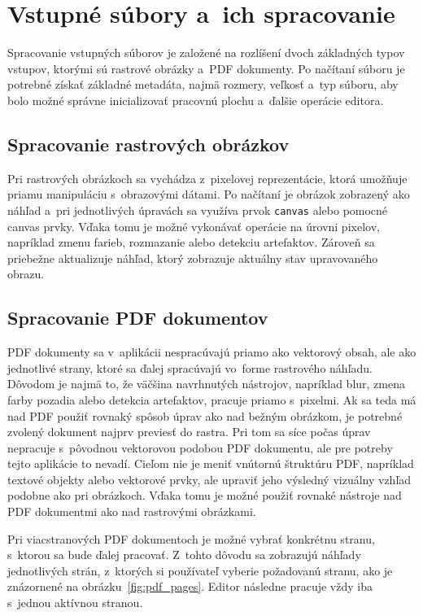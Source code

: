 \section{Vstupné súbory a~ich spracovanie}

Spracovanie vstupných súborov je založené na rozlíšení dvoch základných typov vstupov, ktorými sú rastrové obrázky a~PDF dokumenty. Po načítaní súboru je potrebné získať základné metadáta, najmä rozmery, veľkosť a~typ súboru, aby bolo možné správne inicializovať pracovnú plochu a~ďalšie operácie editora.

\subsection{Spracovanie rastrových obrázkov}

Pri rastrových obrázkoch sa vychádza z~pixelovej reprezentácie, ktorá umožňuje priamu manipuláciu s~obrazovými dátami. Po načítaní je obrázok zobrazený ako náhľad a~pri jednotlivých úpravách sa využíva prvok \texttt{canvas} alebo pomocné canvas prvky. Vďaka tomu je možné vykonávať operácie na úrovni pixelov, napríklad zmenu farieb, rozmazanie alebo detekciu artefaktov. Zároveň sa priebežne aktualizuje náhľad, ktorý zobrazuje aktuálny stav upravovaného obrazu.

\subsection{Spracovanie PDF dokumentov}

PDF dokumenty sa v~aplikácii nespracúvajú priamo ako vektorový obsah, ale ako jednotlivé strany, ktoré sa ďalej spracúvajú vo~forme rastrového náhľadu. Dôvodom je najmä to, že väčšina navrhnutých nástrojov, napríklad blur, zmena farby pozadia alebo detekcia artefaktov, pracuje priamo s~pixelmi. Ak sa teda má nad PDF použiť rovnaký spôsob úprav ako nad bežným obrázkom, je potrebné zvolený dokument najprv previesť do rastra. Pri tom sa síce počas úprav nepracuje s~pôvodnou vektorovou podobou PDF dokumentu, ale pre potreby tejto aplikácie to nevadí. Cieľom nie je meniť vnútornú štruktúru PDF, napríklad textové objekty alebo vektorové prvky, ale upraviť jeho výsledný vizuálny vzhľad podobne ako pri obrázkoch. Vďaka tomu je možné použiť rovnaké nástroje nad PDF dokumentmi ako nad rastrovými obrázkami.

Pri viacstranových PDF dokumentoch je možné vybrať konkrétnu stranu, s~ktorou sa bude ďalej pracovať. Z~tohto dôvodu sa zobrazujú náhľady jednotlivých strán, z~ktorých si používateľ vyberie požadovanú stranu, ako je znázornené na obrázku~\ref{fig:pdf_pages}. Editor následne pracuje vždy iba s~jednou aktívnou stranou.

